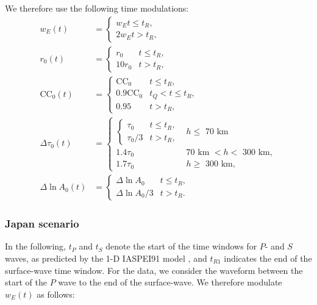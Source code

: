 We therefore use the following time modulations:
\begin{align}
w_E(t) & =
  \begin{cases}
    w_E \text{$t \leq t_R$} ,\\
    2 w_E \text{$t > t_R$},
  \end{cases}
\\
r_0(t) & = 
  \begin{cases}
    r_0 & \text{$t \leq t_R$}, \\
    10r_0 & \text{$t > t_R$} ,
  \end{cases}
\\
\mathrm{CC}_0(t) & = 
  \begin{cases}
    \mathrm{CC}_0 & \text{$t \leq t_R$}, \\
    0.9 \mathrm{CC}_0 & \text{$t_Q < t \leq t_R$}, \\
    0.95 & \text{$t > t_R$} ,
  \end{cases}
\\
\Delta\tau_0(t) & = 
  \begin{cases}
    \begin{cases}
      \tau_0 & \text{$t \leq t_R$}, \\
     \tau_0/3 & \text{$t > t_R$} ,
    \end{cases}
    & \text{$h \leq$ 70~km} \\
    1.4\tau_0 & \text{70~km $< h <$ 300~km}, \\
    1.7\tau_0 & \text{$h \geq$ 300~km},
  \end{cases}
  \\
\Delta \ln A_0(t) & = 
  \begin{cases}
    \Delta \ln A_0 & \text{$t \leq t_R$}, \\
    \Delta \ln A_0/3 & \text{$t > t_R$} .
  \end{cases}
\end{align}


\subsubsection{Japan scenario\label{ap:user_japan}}
In the following, $t_P$ and $t_S$ denote the start of the time windows for $P$- and $S$ waves, as predicted by the 1-D IASPEI91 model \citep{KennettEngdahl1991}, and $t_{R1}$ indicates the end of the surface-wave time window.  For the  data, we consider the waveform between the start of the $P$ wave to the end of the surface-wave.  We therefore modulate $w_E(t)$ as follows:

